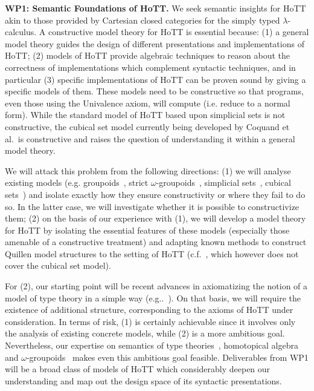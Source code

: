 \documentclass[a4paper,11pt]{article}
\begin{document}



{\bf WP1: Semantic Foundations of HoTT.}  We seek semantic insights
for HoTT akin to those provided by Cartesian closed categories for
the simply typed $\lambda$-calculus.  A constructive model theory for
HoTT is essential because: (1) a general model theory 
guides the design of different presentations and implementations of
HoTT; (2) models of HoTT provide algebraic techniques to reason
about the correctness of implementations which complement syntactic
techniques, and in particular (3) specific implementations of HoTT can
be proven sound by giving a specific models of them.  These models
need to be constructive so that programs, even those using the
Univalence axiom, will compute ({i.e.} reduce to a normal form). While
the standard model of HoTT based upon simplicial sets is not
constructive, the cubical set model currently being developed by Coquand et
{al.}\ is constructive and raises the question of understanding it
within a general model theory.

 We will attack this problem from the following directions: (1) we
 will analyse existing models ({e.g.} groupoids~\cite{HofmannM:groitt}, strict
 $\omega$-groupoids~\cite{WarrenM:strgit}, simplicial sets~\cite{KapulkinC:simmuv}, cubical sets~\cite{BezemM:cubsmt}) and isolate
 exactly how they ensure constructivity or where they fail to do
 so. In the latter case, we will investigate whether it is possible to
 constructivize them; (2) on the basis of our experience with (1), we
 will develop a model theory for HoTT by isolating the essential
 features of these models (especially those amenable of a constructive treatment)
 and  adapting known methods to construct Quillen model structures
 to the setting of HoTT ({c.f.}~\cite{ShulmanM:uniidh}, which however does not cover the cubical set model).

For (2), our starting point will be recent advances in axiomatizing the
notion of a model of type theory in a simple way ({e.g..}~\cite{AwodeyS:natmtt}). On that basis, we will require the existence of additional
structure, corresponding to the axioms of HoTT under consideration. In
terms of risk, (1) is certainly achievable since it involves only the
analysis of existing concrete models, while (2) is a more ambitious
goal. Nevertheless, our expertise on semantics of type
theories~\cite{neil2014relParamDep}, homotopical
algebra~\cite{GambinoN:homl2c,GambinoN:weilsh} and
$\omega$-groupoids~\cite{alti:csl12} makes even this ambitious goal
feasible. Deliverables from WP1 will be a broad class of models of
HoTT which considerably deepen our understanding and map out the
design space of its syntactic presentations.
\end{document}
